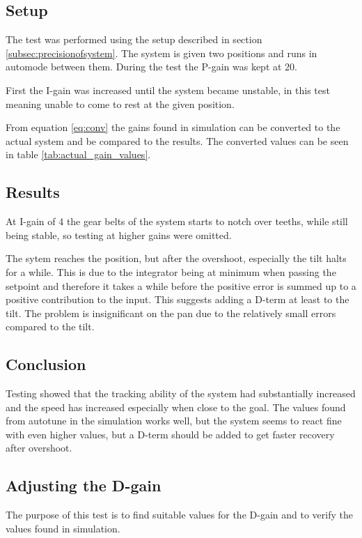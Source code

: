 \subsection*{Setup} The test was performed using the setup described in
section \ref{subsec:precisionofsystem}. The system is given two positions and runs in
automode between them. During the test the P-gain was kept at 20.

First the I-gain was increased until the system became
unstable, in this test meaning unable to come to rest at the given position.

From equation \ref{eq:conv} the gains found in simulation can be converted to the actual
system and be compared to the results. The converted values can be seen in
table \ref{tab:actual_gain_values}. 

\subsection*{Results} 
At I-gain of 4 the gear belts of the system starts
to notch over teeths, while still being stable, so testing at higher gains were
omitted.

The sytem reaches the position, but after the overshoot,
especially the tilt halts for a while. This is due to the integrator being at
minimum when passing the setpoint and therefore it takes a while before the
positive error is summed up to a positive contribution to the input. This
suggests adding a D-term at least to the tilt. The problem is insignificant on
the pan due to the relatively small errors compared to the tilt.

\subsection*{Conclusion} Testing showed that the tracking ability of the system
had substantially increased and the speed has increased especially when close to
the goal. The values found from autotune in the simulation works well, but the
system seems to react fine with even higher values, but a  D-term should be
added to get faster recovery after overshoot.

\subsection{Adjusting the D-gain}\label{sec:pid_experiments_d}
The purpose of this test is to find suitable values for the D-gain and to verify
the values found in simulation.

